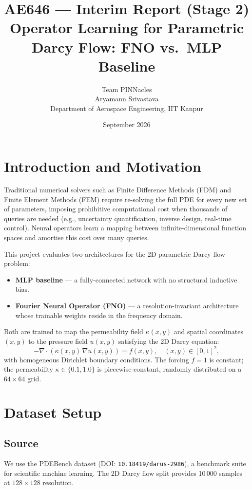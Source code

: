 \documentclass[11pt,a4paper]{article}
\title{\textbf{AE646 --- Interim Report (Stage 2)}\\[0.5em]
\large Operator Learning for Parametric Darcy Flow: FNO vs.\ MLP Baseline}
\author{Team PINNacles\\Aryamann Srivastava\\Department of Aerospace Engineering, IIT Kanpur}
\date{September 2026}
\begin{document}
\maketitle

\section{Introduction and Motivation}

Traditional numerical solvers such as Finite Difference Methods (FDM) and Finite Element Methods (FEM) require re-solving the full PDE for every new set of parameters, imposing prohibitive computational cost when thousands of queries are needed (e.g., uncertainty quantification, inverse design, real-time control). Neural operators learn a mapping between infinite-dimensional function spaces and amortise this cost over many queries.

This project evaluates two architectures for the 2D parametric Darcy flow problem:
\begin{itemize}[nosep]
  \item \textbf{MLP baseline} --- a fully-connected network with no structural inductive bias.
  \item \textbf{Fourier Neural Operator (FNO)} \cite{li2021fno} --- a resolution-invariant architecture whose trainable weights reside in the frequency domain.
\end{itemize}

Both are trained to map the permeability field $\kappa(x,y)$ and spatial coordinates $(x,y)$ to the pressure field $u(x,y)$ satisfying the 2D Darcy equation:
\begin{equation}
  -\nabla \cdot (\kappa(x,y)\,\nabla u(x,y)) = f(x,y), \quad (x,y)\in[0,1]^2,
  \label{eq:darcy}
\end{equation}
with homogeneous Dirichlet boundary conditions. The forcing $f = 1$ is constant; the permeability $\kappa \in \{0.1, 1.0\}$ is piecewise-constant, randomly distributed on a $64\times 64$ grid.

\section{Dataset Setup}

\subsection{Source}
We use the PDEBench dataset \cite{takamoto2022pdebench} (DOI: \texttt{10.18419/darus-2986}), a benchmark suite for scientific machine learning. The 2D Darcy flow split provides 10\,000 samples at $128\times128$ resolution.
\end{document}
